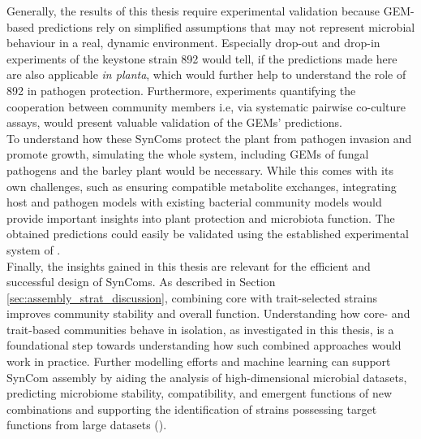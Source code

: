  
Generally, the results of this thesis require experimental validation because GEM-based predictions rely on simplified assumptions that may not represent microbial behaviour in a real, dynamic environment. Especially drop-out and drop-in experiments of the keystone strain 892 would tell, if the predictions made here are also applicable \textit{in planta}, which would further help to understand the role of 892 in pathogen protection. Furthermore, experiments quantifying the cooperation between community members i.e, via systematic pairwise co-culture assays, would present valuable validation of the GEMs’ predictions.
\\


To understand how these SynComs protect the plant from pathogen invasion and promote growth, simulating the whole system, including GEMs of fungal pathogens and the barley plant would be necessary. While this comes with its own challenges, such as ensuring compatible metabolite exchanges, integrating host and pathogen models with existing bacterial community models would provide important insights into plant protection and microbiota function. The obtained predictions could easily be validated using the established experimental system of \cite{mahdi_low_2026}. 
\\


Finally, the insights gained in this thesis are relevant for the efficient and successful design of SynComs. As described in Section \ref{sec:assembly_strat_discussion}, combining core with trait-selected strains improves community stability and overall function. Understanding how core- and trait-based communities behave in isolation, as investigated in this thesis, is a foundational step towards understanding how such combined approaches would work in practice. Further modelling efforts and machine learning can support SynCom assembly by aiding the analysis of high-dimensional microbial datasets, predicting microbiome stability, compatibility, and emergent functions of new combinations and supporting the identification of strains possessing target functions from large datasets (\cite{garces-ruiz_machine_2026}).

